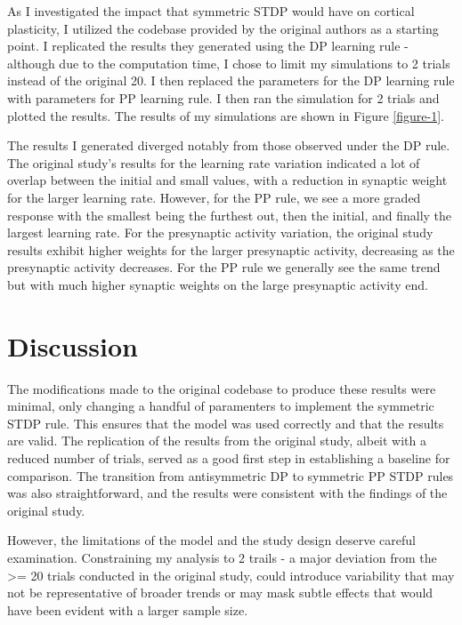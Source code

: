 As I investigated the impact that symmetric STDP would have on cortical plasticity, I utilized the codebase provided by the original authors as a starting point. I replicated the results they generated using the DP learning rule - although due to the computation time, I chose to limit my simulations to 2 trials instead of the original 20. I then replaced the parameters for the DP learning rule with parameters for PP learning rule. I then ran the simulation for 2 trials and plotted the results. The results of my simulations are shown in Figure \ref{figure-1}.

The results I generated diverged notably from those observed under the DP rule. The original study's results for the learning rate variation indicated a lot of overlap between the initial and small values, with a reduction in synaptic weight for the larger learning rate. However, for the PP rule, we see a more graded response with the smallest being the furthest out, then the initial, and finally the largest learning rate. For the presynaptic activity variation, the original study results exhibit higher weights for the larger presynaptic activity, decreasing as the presynaptic activity decreases. For the PP rule we generally see the same trend but with much higher synaptic weights on the large presynaptic activity end.


\section{Discussion}

The modifications made to the original codebase to produce these results were minimal, only changing a handful of paramenters to implement the symmetric STDP rule. This ensures that the model was used correctly and that the results are valid.  The replication of the results from the original study, albeit with a reduced number of trials, served as a good first step in establishing a baseline for comparison. The transition from antisymmetric DP to symmetric PP STDP rules was also straightforward, and the results were consistent with the findings of the original study.

However, the limitations of the model and the study design deserve careful examination. Constraining my analysis to 2 trails - a major deviation from the >= 20 trials conducted in the original study, could introduce variability that may not be representative of broader trends or may mask subtle effects that would have been evident with a larger sample size.

